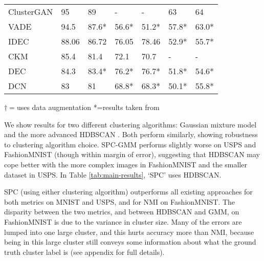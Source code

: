 \documentclass[runningheads]{llncs}
\begin{document}
\begin{table*}[th]
{{\begin{tabular}{@{}lllllll@{}}
    ClusterGAN \cite{Mukherjee2019ClusterGANL}  & 95 & 89 & - & - & 63 & 64\\
    
    VADE \cite{jiang2016variational}  & 94.5 & 87.6* & 56.6* & 51.2* & 57.8* & 63.0*\\
    
    IDEC \cite{guo2017improved}  & 88.06 & 86.72 & 76.05 & 78.46 & 52.9* & 55.7*\\
    
    CKM \cite{gao2020deep}  & 85.4 & 81.4 & 72.1 & 70.7 & - & -\\
    
    DEC \cite{xie2016unsupervised}  & 84.3 & 83.4* & 76.2* & 76.7* & 51.8* & 54.6*\\
    
    DCN \cite{yang2017towards}  & 83 & 81 & 68.8* & 68.3* & 50.1* & 55.8*\\
    
   \bottomrule
  \end{tabular}}}  
  \vspace{1ex}
  \centerline{$\dagger = $uses data augmentation \hspace{10pt} *=results taken from \cite{mrabah2019deep}}
  \vspace{1.5ex}
\caption{\footnotesize Accuracy and NMI of SPC compared to other top-performing image clustering models. The best results are in bold, and the second-best are emphasized. We report the mean and standard deviation (in parentheses) for five runs. } \label{tab:main-results}
  \vspace{-4ex}
  \end{table*}

We show results for two different clustering algorithms: Gaussian mixture model and the more advanced HDBSCAN \cite{mcinnes2017hdbscan}. Both perform similarly, showing robustness to clustering algorithm choice. SPC-GMM performs slightly worse on USPS and FashionMNIST (though within margin of error), suggesting that HDBSCAN  may cope better with the more complex images in FashionMNIST and the smaller dataset in USPS. In Table \ref{tab:main-results}, `SPC' uses HDBSCAN.

SPC (using either clustering algorithm) outperforms all existing approaches for both metrics on MNIST and USPS, and for NMI on FashionMNIST. The disparity between the two metrics, and between HDBSCAN and GMM, on FashionMNIST is due to the variance in cluster size. Many of the errors are lumped into one large cluster, and this hurts accuracy more than NMI, because being in this large cluster still conveys some information about what the ground truth cluster label is (see appendix for full details).
\end{document}
